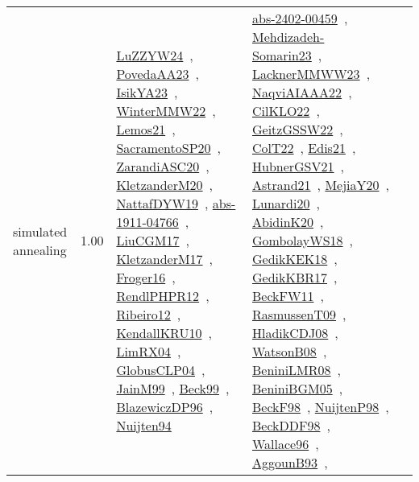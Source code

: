 {\begin{longtable}{p{3cm}r>{\raggedright\arraybackslash}p{6cm}>{\raggedright\arraybackslash}p{6cm}>{\raggedright\arraybackslash}p{8cm}}
\index{simulated annealing}\index{Algorithms!simulated annealing}simulated annealing &  1.00 & \href{../works/LuZZYW24.pdf}{LuZZYW24}~\cite{LuZZYW24}, \href{../works/PovedaAA23.pdf}{PovedaAA23}~\cite{PovedaAA23}, \href{../works/IsikYA23.pdf}{IsikYA23}~\cite{IsikYA23}, \href{../works/WinterMMW22.pdf}{WinterMMW22}~\cite{WinterMMW22}, \href{../works/Lemos21.pdf}{Lemos21}~\cite{Lemos21}, \href{../works/SacramentoSP20.pdf}{SacramentoSP20}~\cite{SacramentoSP20}, \href{../works/ZarandiASC20.pdf}{ZarandiASC20}~\cite{ZarandiASC20}, \href{../works/KletzanderM20.pdf}{KletzanderM20}~\cite{KletzanderM20}, \href{../works/NattafDYW19.pdf}{NattafDYW19}~\cite{NattafDYW19}, \href{../works/abs-1911-04766.pdf}{abs-1911-04766}~\cite{abs-1911-04766}, \href{../works/LiuCGM17.pdf}{LiuCGM17}~\cite{LiuCGM17}, \href{../works/KletzanderM17.pdf}{KletzanderM17}~\cite{KletzanderM17}, \href{../works/Froger16.pdf}{Froger16}~\cite{Froger16}, \href{../works/RendlPHPR12.pdf}{RendlPHPR12}~\cite{RendlPHPR12}, \href{../works/Ribeiro12.pdf}{Ribeiro12}~\cite{Ribeiro12}, \href{../works/KendallKRU10.pdf}{KendallKRU10}~\cite{KendallKRU10}, \href{../works/LimRX04.pdf}{LimRX04}~\cite{LimRX04}, \href{../works/GlobusCLP04.pdf}{GlobusCLP04}~\cite{GlobusCLP04}, \href{../works/JainM99.pdf}{JainM99}~\cite{JainM99}, \href{../works/Beck99.pdf}{Beck99}~\cite{Beck99}, \href{../works/BlazewiczDP96.pdf}{BlazewiczDP96}~\cite{BlazewiczDP96}, \href{../works/Nuijten94.pdf}{Nuijten94}~\cite{Nuijten94} & \href{../works/abs-2402-00459.pdf}{abs-2402-00459}~\cite{abs-2402-00459}, \href{../works/Mehdizadeh-Somarin23.pdf}{Mehdizadeh-Somarin23}~\cite{Mehdizadeh-Somarin23}, \href{../works/LacknerMMWW23.pdf}{LacknerMMWW23}~\cite{LacknerMMWW23}, \href{../works/NaqviAIAAA22.pdf}{NaqviAIAAA22}~\cite{NaqviAIAAA22}, \href{../works/CilKLO22.pdf}{CilKLO22}~\cite{CilKLO22}, \href{../works/GeitzGSSW22.pdf}{GeitzGSSW22}~\cite{GeitzGSSW22}, \href{../works/ColT22.pdf}{ColT22}~\cite{ColT22}, \href{../works/Edis21.pdf}{Edis21}~\cite{Edis21}, \href{../works/HubnerGSV21.pdf}{HubnerGSV21}~\cite{HubnerGSV21}, \href{../works/Astrand21.pdf}{Astrand21}~\cite{Astrand21}, \href{../works/MejiaY20.pdf}{MejiaY20}~\cite{MejiaY20}, \href{../works/Lunardi20.pdf}{Lunardi20}~\cite{Lunardi20}, \href{../works/AbidinK20.pdf}{AbidinK20}~\cite{AbidinK20}, \href{../works/GombolayWS18.pdf}{GombolayWS18}~\cite{GombolayWS18}, \href{../works/GedikKEK18.pdf}{GedikKEK18}~\cite{GedikKEK18}, \href{../works/GedikKBR17.pdf}{GedikKBR17}~\cite{GedikKBR17}, \href{../works/BeckFW11.pdf}{BeckFW11}~\cite{BeckFW11}, \href{../works/RasmussenT09.pdf}{RasmussenT09}~\cite{RasmussenT09}, \href{../works/HladikCDJ08.pdf}{HladikCDJ08}~\cite{HladikCDJ08}, \href{../works/WatsonB08.pdf}{WatsonB08}~\cite{WatsonB08}, \href{../works/BeniniLMR08.pdf}{BeniniLMR08}~\cite{BeniniLMR08}, \href{../works/BeniniBGM05.pdf}{BeniniBGM05}~\cite{BeniniBGM05}, \href{../works/BeckF98.pdf}{BeckF98}~\cite{BeckF98}, \href{../works/NuijtenP98.pdf}{NuijtenP98}~\cite{NuijtenP98}, \href{../works/BeckDDF98.pdf}{BeckDDF98}~\cite{BeckDDF98}, \href{../works/Wallace96.pdf}{Wallace96}~\cite{Wallace96}, \href{../works/AggounB93.pdf}{AggounB93}~\cite{AggounB93}, 
\end{longtable}}
